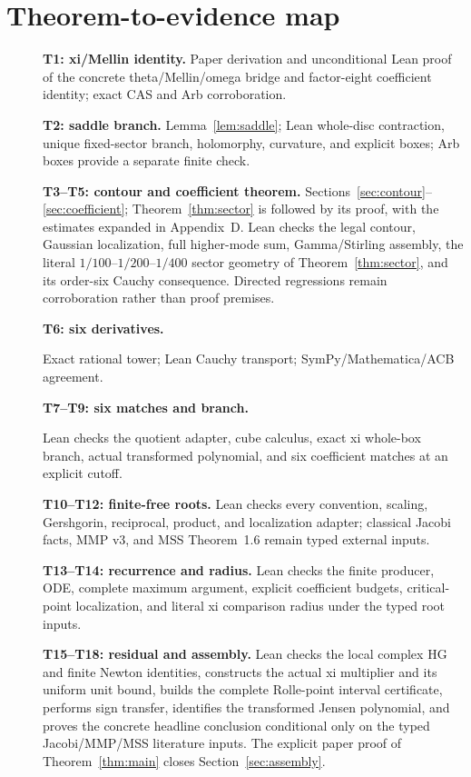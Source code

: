 \documentclass[12pt]{article}
\begin{document}
\appendix
\section{Theorem-to-evidence map}\label{app:map}

\begin{description}
\item[]\textbf{T1: xi/Mellin identity.} Paper derivation and unconditional Lean
proof of the concrete theta/Mellin/omega bridge and factor-eight coefficient
identity; exact CAS and Arb corroboration.
\item[]\textbf{T2: saddle branch.} Lemma~\ref{lem:saddle}; Lean whole-disc
contraction, unique fixed-sector branch, holomorphy, curvature, and explicit
boxes; Arb boxes provide a separate finite check.
\item[]\textbf{T3--T5: contour and coefficient theorem.}
Sections~\ref{sec:contour}--\ref{sec:coefficient}; Theorem~\ref{thm:sector}
is followed by its proof, with the estimates expanded in Appendix~D.
Lean checks the legal contour, Gaussian localization, full higher-mode sum,
Gamma/Stirling assembly, the literal $1/100$--$1/200$--$1/400$ sector
geometry of Theorem~\ref{thm:sector}, and its order-six Cauchy consequence. Directed
regressions remain corroboration rather than proof premises.
\item[]\textbf{T6: six derivatives.}\par
Exact rational tower; Lean Cauchy transport;
SymPy/Mathematica/ACB agreement.
\item[]\textbf{T7--T9: six matches and branch.}\par
Lean checks the quotient adapter, cube calculus, exact xi whole-box branch,
actual transformed polynomial, and six coefficient matches at an explicit
cutoff.
\item[]\textbf{T10--T12: finite-free roots.} Lean checks every convention,
scaling, Gershgorin, reciprocal, product, and localization adapter; classical
Jacobi facts, MMP v3, and MSS Theorem~1.6 remain typed external inputs.
\item[]\textbf{T13--T14: recurrence and radius.} Lean checks the finite producer,
ODE, complete maximum argument, explicit coefficient budgets, critical-point
localization, and literal xi comparison radius under the typed root inputs.
\item[]\textbf{T15--T18: residual and assembly.} Lean checks the local
complex HG and finite Newton identities, constructs the actual xi multiplier
and its uniform unit bound, builds the complete Rolle-point interval
certificate, performs sign transfer, identifies the transformed Jensen
polynomial, and proves the concrete headline conclusion conditional only on
the typed Jacobi/MMP/MSS literature inputs.  The explicit paper proof of
Theorem~\ref{thm:main} closes Section~\ref{sec:assembly}.
\end{description}





\end{document}
